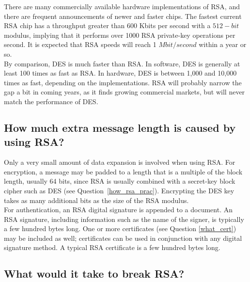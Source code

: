 There are many commercially available hardware implementations of RSA,
and there are frequent announcements of newer and faster chips. The
fastest current RSA chip has a throughput greater than 600 Kbits per
second with a $512-bit$ modulus, implying that it performs over 1000 RSA
private-key operations per second. It is expected that RSA speeds will
reach 1 $Mbit/second$ within a year or so.\\

By comparison, DES is much faster than RSA. In software, DES is
generally at least 100 times as fast as RSA. In hardware, DES is
between 1,000 and 10,000 times as fast, depending on the
implementations. RSA will probably narrow the gap a bit in coming
years, as it finds growing commercial markets, but will never match the
performance of DES.

\subsection{How much extra message length is caused by using RSA?}

Only a very small amount of data expansion is involved when using RSA.  For
encryption, a message may be padded to a length that is a multiple of the
block length, usually 64 bits, since RSA is usually combined with a
secret-key block cipher such as DES (see Question~\ref{how_rsa_prac}).
Encrypting the DES key takes as many additional bits as the size of the RSA
modulus.\\

For authentication, an RSA digital signature is appended to a document.  An
RSA signature, including information such as the name of the signer, is
typically a few hundred bytes long. One or more certificates (see Question
\ref{what_cert}) may be included as well; certificates can be used in
conjunction with any digital signature method. A typical RSA certificate is
a few hundred bytes long.

\subsection{What would it take to break RSA?}
\label{what_break_rsa}

